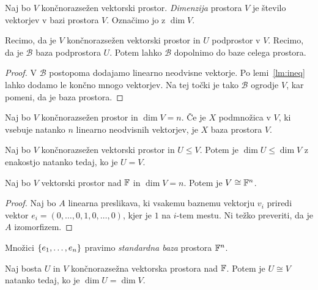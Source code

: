 \documentclass[12pt, a4paper]{article}
\begin{document}
\begin{definicija}
Naj bo $V$ končnorazsežen vektorski prostor. \emph{Dimenzija} prostora $V$ je število vektorjev v bazi prostora $V$. Označimo jo z $\dim V$.
\end{definicija}

\begin{trditev}
Recimo, da je $V$ končnorazsežen vektorski prostor in $U$ podprostor v $V$. Recimo, da je $\mathcal{B}$ baza podprostora $U$. Potem lahko $\mathcal{B}$ dopolnimo do baze celega prostora.
\end{trditev}

\begin{proof}
V $\mathcal{B}$ postopoma dodajamo linearno neodvisne vektorje. Po lemi~\ref{lm:ineq} lahko dodamo le končno mnogo vektorjev. Na tej točki je tako $\mathcal{B}$ ogrodje $V$, kar pomeni, da je baza prostora.
\end{proof}

\begin{posledica}
Naj bo $V$ končnorazsežen prostor in $\dim V=n$. Če je $X$ podmnožica v $V$, ki vsebuje natanko $n$ linearno neodvisnih vektorjev, je $X$ baza prostora $V$.
\end{posledica}

\begin{posledica}
Naj bo $V$ končnorazsežen vektorski prostor in $U\leq V$. Potem je $\dim U\leq\dim V$ z enakostjo natanko tedaj, ko je $U=V$.
\end{posledica}

\begin{izrek}
Naj bo $V$ vektorski prostor nad $\mathbb{F}$ in $\dim V=n$. Potem je $V\cong\mathbb{F}^n$.
\end{izrek}

\begin{proof}
Naj bo $A$ linearna preslikava, ki vsakemu baznemu vektorju $v_i$ priredi vektor $e_i=(0,\dots,0,1,0,\dots,0)$, kjer je $1$ na $i$-tem mestu. Ni težko preveriti, da je $A$ izomorfizem.
\end{proof}

\begin{opomba}
Množici $\left\{e_1,\dots,e_n\right\}$ pravimo \emph{standardna baza} prostora $\mathbb{F}^n$.
\end{opomba}

\begin{izrek}
Naj bosta $U$ in $V$ končnorazsežna vektorska prostora nad $\mathbb{F}$. Potem je $U\cong V$ natanko tedaj, ko je $\dim U=\dim V$.
\end{izrek}
\end{document}
